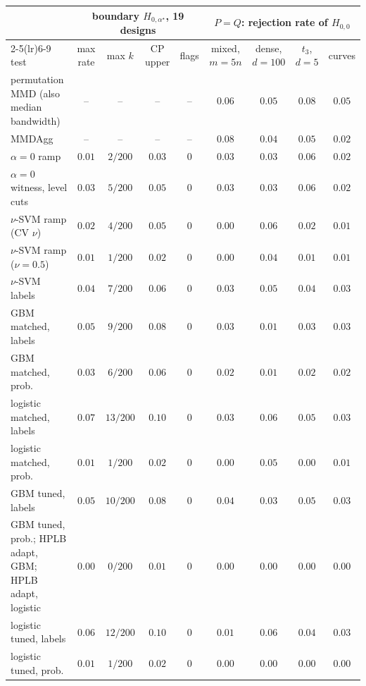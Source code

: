 \begin{tabular}{lcccccccc}
\toprule
 & \multicolumn{4}{c}{boundary $H_{0,\alpha^\star}$, 19 designs} & \multicolumn{4}{c}{$P=Q$: rejection rate of $H_{0,0}$} \\
\cmidrule(lr){2-5}\cmidrule(lr){6-9}
test & max rate & max $k$ & CP upper & flags & mixed, $m=5n$ & dense, $d=100$ & $t_3$, $d=5$ & curves \\
\midrule
permutation MMD (also median bandwidth) & -- & -- & -- & -- & $0.06$ & $0.05$ & $0.08$ & $0.05$ \\
MMDAgg & -- & -- & -- & -- & $0.08$ & $0.04$ & $0.05$ & $0.02$ \\
$\alpha=0$ ramp & $0.01$ & $2/200$ & $0.03$ & $0$ & $0.03$ & $0.03$ & $0.06$ & $0.02$ \\
$\alpha=0$ witness, level cuts & $0.03$ & $5/200$ & $0.05$ & $0$ & $0.03$ & $0.03$ & $0.06$ & $0.02$ \\
$\nu$-SVM ramp (CV $\nu$) & $0.02$ & $4/200$ & $0.05$ & $0$ & $0.00$ & $0.06$ & $0.02$ & $0.01$ \\
$\nu$-SVM ramp ($\nu=0.5$) & $0.01$ & $1/200$ & $0.02$ & $0$ & $0.00$ & $0.04$ & $0.01$ & $0.01$ \\
$\nu$-SVM labels & $0.04$ & $7/200$ & $0.06$ & $0$ & $0.03$ & $0.05$ & $0.04$ & $0.03$ \\
GBM matched, labels & $0.05$ & $9/200$ & $0.08$ & $0$ & $0.03$ & $0.01$ & $0.03$ & $0.03$ \\
GBM matched, prob. & $0.03$ & $6/200$ & $0.06$ & $0$ & $0.02$ & $0.01$ & $0.02$ & $0.02$ \\
logistic matched, labels & $0.07$ & $13/200$ & $0.10$ & $0$ & $0.03$ & $0.06$ & $0.05$ & $0.03$ \\
logistic matched, prob. & $0.01$ & $1/200$ & $0.02$ & $0$ & $0.00$ & $0.05$ & $0.00$ & $0.01$ \\
GBM tuned, labels & $0.05$ & $10/200$ & $0.08$ & $0$ & $0.04$ & $0.03$ & $0.05$ & $0.03$ \\
GBM tuned, prob.; HPLB adapt, GBM; HPLB adapt, logistic & $0.00$ & $0/200$ & $0.01$ & $0$ & $0.00$ & $0.00$ & $0.00$ & $0.00$ \\
logistic tuned, labels & $0.06$ & $12/200$ & $0.10$ & $0$ & $0.01$ & $0.06$ & $0.04$ & $0.03$ \\
logistic tuned, prob. & $0.01$ & $1/200$ & $0.02$ & $0$ & $0.00$ & $0.00$ & $0.00$ & $0.00$ \\

\end{tabular}
